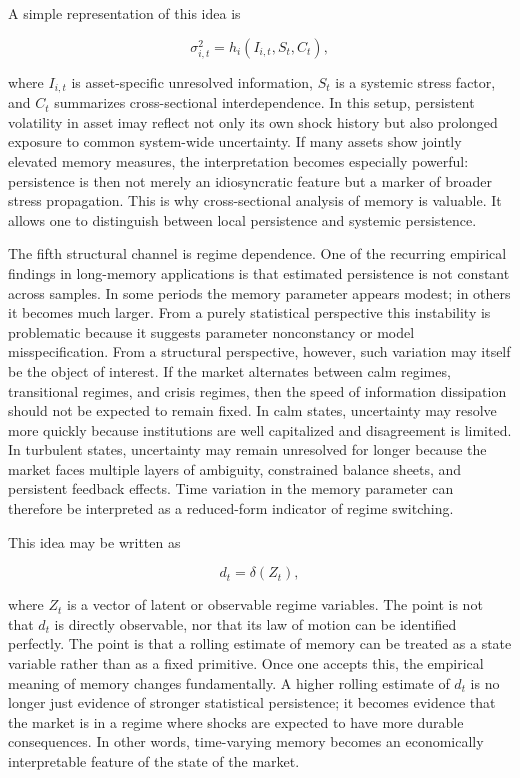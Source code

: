 \documentclass[12pt]{article}
\begin{document}
A simple representation of this idea is

\[\sigma_{i,t}^2 = h_i(I_{i,t}, S_t, C_t),\]

where $I_{i,t}$ is asset-specific unresolved information, $S_t$ is a systemic stress factor, and $C_t$ summarizes cross-sectional interdependence. In this setup, persistent volatility in asset imay reflect not only its own shock history but also prolonged exposure to common system-wide uncertainty. If many assets show jointly elevated memory measures, the interpretation becomes especially powerful: persistence is then not merely an idiosyncratic feature but a marker of broader stress propagation. This is why cross-sectional analysis of memory is valuable. It allows one to distinguish between local persistence and systemic persistence.

The fifth structural channel is regime dependence. One of the recurring empirical findings in long-memory applications is that estimated persistence is not constant across samples. In some periods the memory parameter appears modest; in others it becomes much larger. From a purely statistical perspective this instability is problematic because it suggests parameter nonconstancy or model misspecification. From a structural perspective, however, such variation may itself be the object of interest. If the market alternates between calm regimes, transitional regimes, and crisis regimes, then the speed of information dissipation should not be expected to remain fixed. In calm states, uncertainty may resolve more quickly because institutions are well capitalized and disagreement is limited. In turbulent states, uncertainty may remain unresolved for longer because the market faces multiple layers of ambiguity, constrained balance sheets, and persistent feedback effects. Time variation in the memory parameter can therefore be interpreted as a reduced-form indicator of regime switching.

This idea may be written as

\[d_t = \delta(Z_t),\]

where $Z_t$ is a vector of latent or observable regime variables. The point is not that $d_t$ is directly observable, nor that its law of motion can be identified perfectly. The point is that a rolling estimate of memory can be treated as a state variable rather than as a fixed primitive. Once one accepts this, the empirical meaning of memory changes fundamentally. A higher rolling estimate of $d_t$ is no longer just evidence of stronger statistical persistence; it becomes evidence that the market is in a regime where shocks are expected to have more durable consequences. In other words, time-varying memory becomes an economically interpretable feature of the state of the market.
\end{document}

